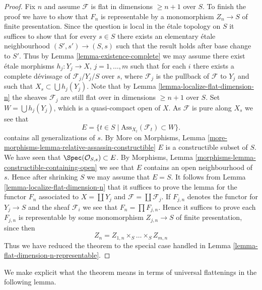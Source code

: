 \begin{proof}
\medskip\noindent
Fix $n$ and assume $\mathcal{F}$ is flat in dimensions $\geq n + 1$
over $S$. To finish the proof we have to show that $F_n$ is representable
by a monomorphism $Z_n \to S$ of finite presentation.
Since the question is local in the \'etale topology on $S$ it suffices to
show that for every $s \in S$ there exists an elementary \'etale neighbourhood
$(S', s') \to (S, s)$ such that the result holds after base change to $S'$.
Thus by
Lemma \ref{lemma-existence-complete}
we may assume there exist \'etale morphisms $h_j : Y_j \to X$,
$j = 1, \ldots, m$ such that for each $i$ there exists a complete
d\'evissage of $\mathcal{F}_j/Y_j/S$ over $s$,
where $\mathcal{F}_j$ is the pullback of $\mathcal{F}$ to $Y_j$
and such that $X_s \subset \bigcup h_j(Y_j)$. Note that by
Lemma \ref{lemma-localize-flat-dimension-n}
the sheaves $\mathcal{F}_j$ are still flat over in
dimensions $\geq n + 1$ over $S$.
Set $W = \bigcup h_j(Y_j)$, which is a quasi-compact open of $X$.
As $\mathcal{F}$ is pure along $X_s$ we see that
$$
E = \{t \in S \mid \text{Ass}_{X_t}(\mathcal{F}_t) \subset W \}.
$$
contains all generalizations of $s$. By
More on Morphisms,
Lemma \ref{more-morphisms-lemma-relative-assassin-constructible}
$E$ is a constructible subset of $S$. We have seen that
$\Spec(\mathcal{O}_{S, s}) \subset E$. By
Morphisms, Lemma \ref{morphisms-lemma-constructible-containing-open}
we see that $E$ contains an open neighbourhood of $s$.
Hence after shrinking $S$ we may assume that $E = S$.
It follows from
Lemma \ref{lemma-localize-flat-dimension-n}
that it suffices to prove the lemma for the functor $F_n$ associated to
$X = \coprod Y_j$ and $\mathcal{F} = \coprod \mathcal{F}_j$.
If $F_{j, n}$ denotes the functor for $Y_j \to S$ and the sheaf
$\mathcal{F}_i$ we see that $F_n = \prod F_{j, n}$. Hence it suffices
to prove each $F_{j, n}$ is representable by some monomorphism
$Z_{j, n} \to S$ of finite presentation, since then
$$
Z_n = Z_{1, n} \times_S \ldots \times_S Z_{m, n}
$$
Thus we have reduced the theorem to the special case handled in
Lemma \ref{lemma-flat-dimension-n-representable}.
\end{proof}

\noindent
We make explicit what the theorem means in terms of universal
flattenings in the following lemma.

